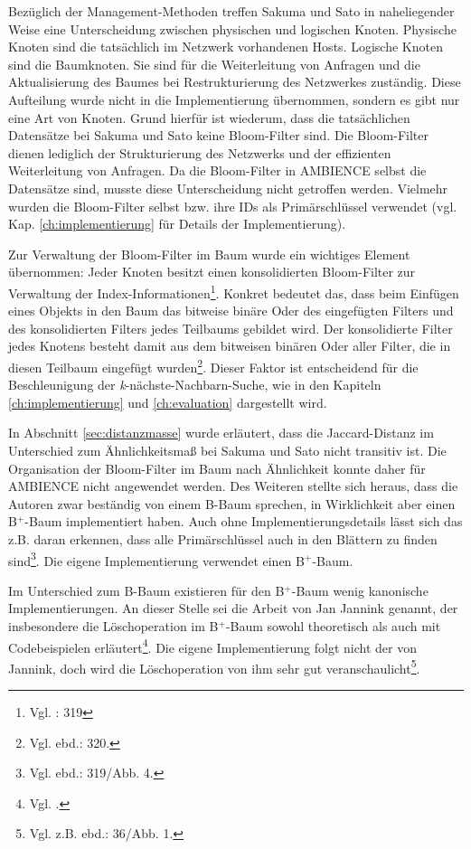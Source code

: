 Bezüglich der Management-Methoden treffen Sakuma und Sato in naheliegender Weise eine Unterscheidung zwischen physischen und logischen Knoten. Physische Knoten sind die tatsächlich im Netzwerk vorhandenen Hosts. Logische Knoten sind die Baumknoten. Sie sind für die Weiterleitung von Anfragen und die Aktualisierung des Baumes bei Restrukturierung des Netzwerkes zuständig. Diese Aufteilung wurde nicht in die Implementierung übernommen, sondern es gibt nur eine Art von Knoten. Grund hierfür ist wiederum, dass die tatsächlichen Datensätze bei Sakuma und Sato keine Bloom-Filter sind. Die Bloom-Filter dienen lediglich der Strukturierung des Netzwerks und der effizienten Weiterleitung von Anfragen. Da die Bloom-Filter in AMBIENCE selbst die Datensätze sind, musste diese Unterscheidung nicht getroffen werden. Vielmehr wurden die Bloom-Filter selbst bzw. ihre IDs als Primärschlüssel verwendet (vgl. Kap. \ref{ch:implementierung} für Details der Implementierung). 

Zur Verwaltung der Bloom-Filter im Baum wurde ein wichtiges Element übernommen: Jeder Knoten besitzt einen konsolidierten Bloom-Filter zur Verwaltung der Index-Informationen\footnote{Vgl. \cite{Sakuma2011}: 319}.  Konkret bedeutet das, dass beim Einfügen eines Objekts in den Baum das bitweise binäre Oder des eingefügten Filters und des konsolidierten Filters jedes Teilbaums gebildet wird. Der konsolidierte Filter jedes Knotens besteht damit aus dem bitweisen binären Oder aller Filter, die in diesen Teilbaum eingefügt wurden\footnote{Vgl. ebd.: 320.}. Dieser Faktor ist entscheidend für die Beschleunigung der \textit{k}-nächste-Nachbarn-Suche, wie in den Kapiteln \ref{ch:implementierung} und \ref{ch:evaluation} dargestellt wird. 

In Abschnitt \ref{sec:distanzmasse} wurde erläutert, dass die Jaccard-Distanz im Unterschied zum Ähnlichkeitsmaß bei Sakuma und Sato nicht transitiv ist. Die Organisation der Bloom-Filter im Baum nach Ähnlichkeit konnte daher für AMBIENCE nicht angewendet werden. Des Weiteren stellte sich heraus, dass die Autoren zwar beständig von einem B-Baum sprechen, in Wirklichkeit aber einen B$^+$-Baum implementiert haben. Auch ohne Implementierungsdetails lässt sich das z.B. daran erkennen, dass alle Primärschlüssel auch in den Blättern zu finden sind\footnote{Vgl. ebd.: 319/Abb. 4.}. Die eigene Implementierung verwendet einen B$^+$-Baum. 

Im Unterschied zum B-Baum existieren für den B$^+$-Baum wenig kanonische Implementierungen. An dieser Stelle sei die Arbeit von Jan Jannink genannt, der insbesondere die Löschoperation im B$^+$-Baum sowohl theoretisch als auch mit Codebeispielen erläutert\footnote{Vgl. \cite{Jannink1995}.}. Die eigene Implementierung folgt nicht der von Jannink, doch wird die Löschoperation von ihm sehr gut veranschaulicht\footnote{Vgl. z.B. ebd.: 36/Abb. 1.}. 

